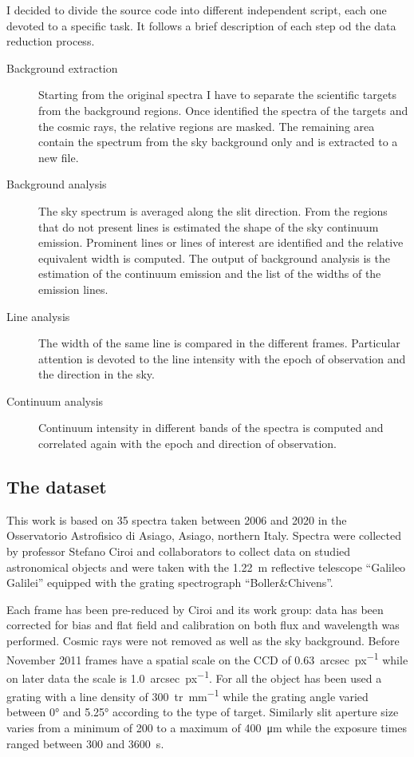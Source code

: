 I decided to divide the source code into different independent script, each one devoted to a specific task. It follows a brief description of each step od the data reduction process.
\begin{description}
	\item [Background extraction] Starting from the original spectra I have to separate the scientific targets from the background regions. Once identified the spectra of the targets and the cosmic rays, the relative regions are masked. The remaining area contain the spectrum from the sky background only and is extracted to a new file.
	\item [Background analysis] The sky spectrum is averaged along the slit direction. From the regions that do not present lines is estimated the shape of the sky continuum emission. Prominent lines or lines of interest are identified and the relative equivalent width is computed. The output of background analysis is the estimation of the continuum emission and the list of the widths of the emission lines.
	\item [Line analysis] The width of the same line is compared in the different frames. Particular attention is devoted to the line intensity with the epoch of observation and the direction in the sky.
	\item [Continuum analysis] Continuum intensity in different bands of the spectra is computed and correlated again with the epoch and direction of observation.
\end{description}

\subsection{The dataset}
This work is based on 35 spectra taken between 2006 and 2020 in the Osservatorio Astrofisico di Asiago, Asiago, northern Italy. Spectra were collected by professor Stefano Ciroi and collaborators to collect data on studied astronomical objects and were taken with the \SI{1.22}{m} reflective telescope ``Galileo Galilei'' equipped with the grating spectrograph ``Boller\&Chivens''.

Each frame has been pre-reduced by Ciroi and its work group: data has been corrected for bias and flat field and calibration on both flux and wavelength was performed. Cosmic rays were not removed as well as the sky background. Before November 2011 frames have a spatial scale on the CCD of \SI{0.63}{arcsec\per{px}} while on later data the scale is \SI{1.0}{arcsec\per{px}}. For all the object has been used a grating with a line density of \SI{300}{tr\per{mm}} while the grating angle varied between \ang{0} and \ang{5.25} according to the type of target. Similarly slit aperture size varies from a minimum of 200 to a maximum of \SI{400}{\micro\metre} while the exposure times ranged between 300 and \SI{3600}{s}.


